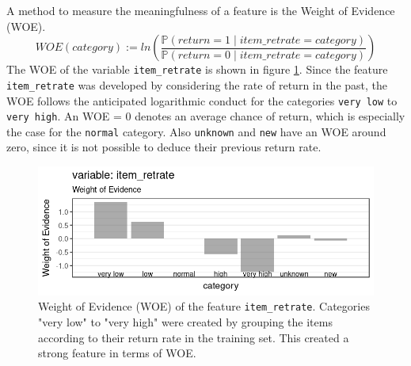 \documentclass[a4paper,12pt]{article}
\begin{document}
A method to measure the meaningfulness of a feature is the Weight of Evidence (WOE).\\  
\begin{equation*}
WOE(category) := ln \left( \frac{\mathbb{P}(return=1 \mid item\_retrate=category)}{\mathbb{P}(return=0 \mid item\_retrate=category)} \right) 
\end{equation*}
\newline
The WOE of the variable \texttt{item\_retrate} is shown in figure \ref{Figure::ItemRetrateWOE}.
Since the feature \texttt{item\_retrate} was developed by considering the rate of return in the past, the WOE follows the anticipated logarithmic conduct for the categories \texttt{very low} to \texttt{very high}. An WOE = 0 denotes an average chance of return, which is especially the case for the \texttt{normal} category. Also \texttt{unknown} and \texttt{new} have an WOE around zero, since it is not possible to deduce their previous return rate. \\

\begin{figure}[h]
  \begin{minipage}[c]{0.65\textwidth}
    \includegraphics[width=\textwidth]{pictures/item_retrate_woe.png}
  \end{minipage}\hfill
  \begin{minipage}[c]{0.35\textwidth}
    \caption{Weight of Evidence (WOE) of the feature \texttt{item\_retrate}. Categories "very low" to "very high" were created by grouping the items  according to their return rate in the training set. This created a strong feature in terms of WOE.} \label{Figure::ItemRetrateWOE}
  \end{minipage}
\end{figure}

\end{document}

